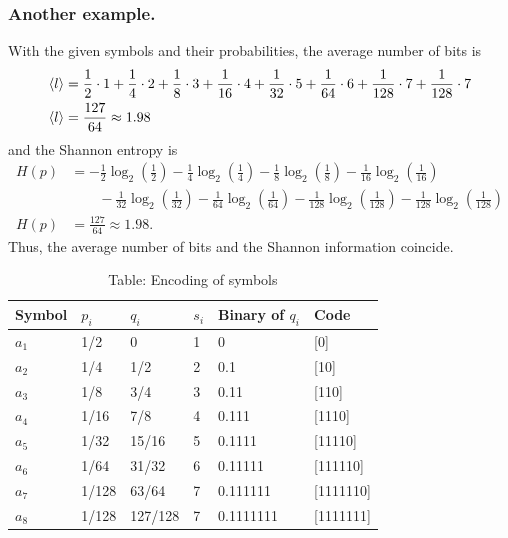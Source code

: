 \documentclass[../../../main.tex]{subfiles}
\begin{document}
\subsubsection{Another example.}
With the given symbols and their probabilities, the average number of bits is
\begin{align*}
  \braket{l }
   & = \frac{1}{2}\cdot 1+\frac{1}{4}\cdot 2+\frac{1}{8}\cdot 3+\frac{1}{16}\cdot 4+\frac{1}{32}\cdot 5+\frac{1}{64}\cdot 6+\frac{1}{128}\cdot 7+\frac{1}{128}\cdot 7 \\
  \braket{l }
   & =  \frac{127}{64} \approx 1.98
\end{align*}
and the Shannon entropy is
\begin{align*}
  H(p) & = -\frac{1}{2}\log_2\left(\frac{1}{2}\right)-\frac{1}{4}\log_2\left(\frac{1}{4}\right)-\frac{1}{8}\log_2\left(\frac{1}{8}\right)-\frac{1}{16}\log_2\left(\frac{1}{16}\right)                \\
       & \qquad -\frac{1}{32}\log_2\left(\frac{1}{32}\right)-\frac{1}{64}\log_2\left(\frac{1}{64}\right)-\frac{1}{128}\log_2\left(\frac{1}{128}\right)-\frac{1}{128}\log_2\left(\frac{1}{128}\right) \\
  H(p) & = \frac{127}{64}\approx 1.98.
\end{align*}
Thus, the average number of bits and the Shannon information coincide.

\begin{table}[]
  \centering
  \caption{Table: Encoding of symbols}
  \begin{tabular}{@{}llllll@{}}
    \toprule
    Symbol & $p_i$ & $q_i$   & $s_i$ & Binary of $q_i$ & Code      \\
    \midrule
    $a_1$  & 1/2   & 0       & 1     & 0               & [0]       \\
    $a_2$  & 1/4   & 1/2     & 2     & 0.1             & [10]      \\
    $a_3 $ & 1/8   & 3/4     & 3     & 0.11            & [110]     \\
    $a_4$  & 1/16  & 7/8     & 4     & 0.111           & [1110]    \\
    $a_5 $ & 1/32  & 15/16   & 5     & 0.1111          & [11110]   \\
    $a_6$  & 1/64  & 31/32   & 6     & 0.11111         & [111110]  \\
    $a_7$  & 1/128 & 63/64   & 7     & 0.111111        & [1111110] \\
    $a_8$  & 1/128 & 127/128 & 7     & 0.1111111       & [1111111] \\
    \bottomrule
  \end{tabular}
\end{table}
\end{document}
